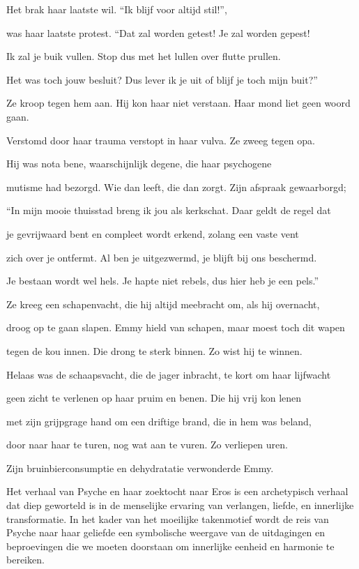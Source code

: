 Het brak haar laatste wil.
“Ik blijf voor altijd stil!”,

was haar laatste protest.
“Dat zal worden getest!
Je zal worden gepest!

Ik zal je buik vullen.
Stop dus met het lullen
over flutte prullen.

Het was toch jouw besluit?
Dus lever ik je uit
of blijf je toch mijn buit?”

Ze kroop tegen hem aan.
Hij kon haar niet verstaan.
Haar mond liet geen woord gaan.

Verstomd door haar trauma
verstopt in haar vulva.
Ze zweeg tegen opa.

Hij was nota bene,
waarschijnlijk degene,
die haar psychogene

mutisme had bezorgd.
Wie dan leeft, die dan zorgt.
Zijn afspraak gewaarborgd;

“In mijn mooie thuisstad
breng ik jou als kerkschat.
Daar geldt de regel dat

je gevrijwaard bent
en compleet wordt erkend,
zolang een vaste vent

zich over je ontfermt.
Al ben je uitgezwermd,
je blijft bij ons beschermd.

Je bestaan wordt wel hels.
Je hapte niet rebels,
dus hier heb je een pels.”

Ze kreeg een schapenvacht,
die hij altijd meebracht
om, als hij overnacht,

droog op te gaan slapen.
Emmy hield van schapen,
maar moest toch dit wapen

tegen de kou innen.
Die drong te sterk binnen.
Zo wist hij te winnen.

Helaas was de schaapsvacht,
die de jager inbracht,
te kort om haar lijfwacht

geen zicht te verlenen
op haar pruim en benen.
Die hij vrij kon lenen

met zijn grijpgrage hand
om een driftige brand,
die in hem was beland,

door naar haar te turen,
nog wat aan te vuren.
Zo verliepen uren.

Zijn bruinbierconsumptie en dehydratatie verwonderde Emmy.

Het verhaal van Psyche en haar zoektocht naar Eros is een archetypisch verhaal dat diep geworteld is in de menselijke ervaring van verlangen, liefde, en innerlijke transformatie. In het kader van het moeilijke takenmotief wordt de reis van Psyche naar haar geliefde een symbolische weergave van de uitdagingen en beproevingen die we moeten doorstaan om innerlijke eenheid en harmonie te bereiken.

